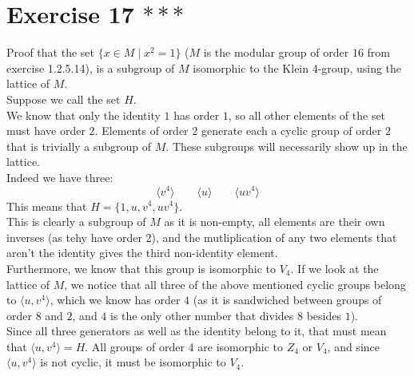 \documentclass[12pt]{article}
\begin{document}
    \section*{Exercise 17 $***$}
    Proof that the set $\{x \in M \mid x^2 = 1\}$ 
    ($M$ is the modular group of order $16$ from exercise 1.2.5.14),
    is a subgroup of $M$ isomorphic to the Klein 4-group,
    using the lattice of $M$. \\ 
    Suppose we call the set $H$. \\
    We know that only the identity $1$ has order $1$,
    so all other elements of the set must have order $2$.
    Elements of order $2$ generate each a cyclic group of order $2$
    that is trivially a subgroup of $M$.
    These subgroups will necessarily show up in the lattice. \\
    Indeed we have three:
    \[ \langle v^4 \rangle 
    \qquad \langle u \rangle 
    \qquad \langle uv^4 \rangle  \]
    This means that $H = \{ 1, u, v^4, uv^4 \}$. \\
    This is clearly a subgroup of $M$ as it is non-empty,
    all elements are their own inverses (as tehy have order $2$),
    and the mutliplication of any two elements that aren't the identity
    gives the third non-identity element. \\
    Furthermore, we know that this group is isomorphic to $V_4$.
    If we look at the lattice of $M$,
    we notice that all three of the above mentioned cyclic groups
    belong to $\langle u, v^4 \rangle$,
    which we know has order $4$
    (as it is sandwiched between groups of order $8$ and $2$,
    and $4$ is the only other number that divides $8$ besides $1$). \\
    Since all three generators as well as the identity belong to it,
    that must mean that $\langle u, v^4 \rangle = H$.
    All groups of order $4$ are isomorphic to $Z_4$ or $V_4$,
    and since $\langle u, v^4 \rangle$ is not cyclic,
    it must be isomorphic to $V_4$.
\end{document}
